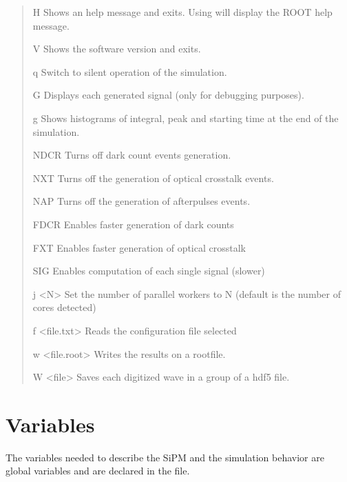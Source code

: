 \documentclass[letterpaper,10pt,english]{sphinxmanual}
\begin{document}
\begin{quote}
\begin{optionlist}{3cm}
\item [\sphinxhyphen{}H]  
Shows an help message and exits. Using  will display the ROOT help message.
\item [\sphinxhyphen{}V]  
Shows the software version and exits.
\item [\sphinxhyphen{}q]  
Switch to silent operation of the simulation.
\item [\sphinxhyphen{}G]  
Displays each generated signal (only for debugging purposes).
\item [\sphinxhyphen{}g]  
Shows histograms of integral, peak and starting time at the end of the simulation.
\item [\sphinxhyphen{}NDCR]  
Turns off dark count events generation.
\item [\sphinxhyphen{}NXT]  
Turns off the generation of optical crosstalk events.
\item [\sphinxhyphen{}NAP]  
Turns off the generation of afterpulses events.
\item [\sphinxhyphen{}FDCR]  
Enables faster generation of dark counts {\hyperref[\detokenize{theory:dcrtheory}]{}}
\item [\sphinxhyphen{}FXT]  
Enables faster generation of optical crosstalk {\hyperref[\detokenize{theory:xttheory}]{}}
\item [\sphinxhyphen{}SIG]  
Enables computation of each single signal (slower)
\item [\sphinxhyphen{}j \textless{}N\textgreater{}]  
Set the number of parallel workers to N (default is the number of cores detected)
\item [\sphinxhyphen{}f \textless{}file.txt\textgreater{}]  
Reads the configuration file selected
\item [\sphinxhyphen{}w \textless{}file.root\textgreater{}]  
Writes the results on a rootfile.
\item [\sphinxhyphen{}W \textless{}file\textgreater{}]  
Saves each digitized wave in a group of a hdf5 file.
\end{optionlist}
\end{quote}


\chapter{Variables}
\label{\detokenize{variables:variables}}\label{\detokenize{variables::doc}}
The variables needed to describe the SiPM and the simulation behavior are global variables and are declared in the  file.
\end{document}
